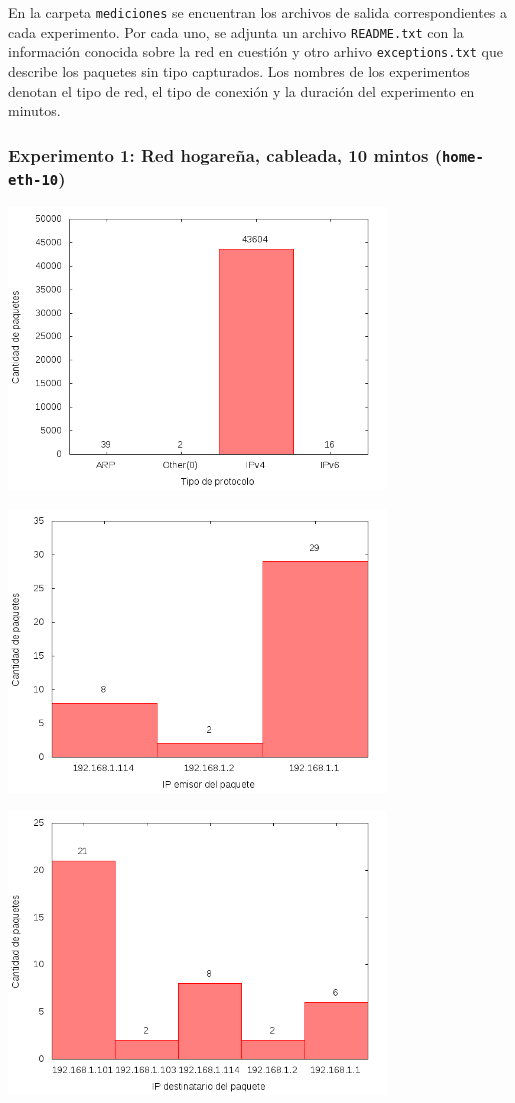 En la carpeta \texttt{mediciones} se encuentran los archivos de salida correspondientes a cada
experimento. Por cada uno, se adjunta un archivo \texttt{README.txt} con la información conocida
sobre la red en cuestión y otro arhivo \texttt{exceptions.txt} que describe los paquetes sin tipo
capturados. Los nombres de los experimentos denotan el tipo de red, el tipo de conexión y la
duración del experimento en minutos.

\subsubsection{Experimento 1: Red hogareña, cableada, 10 mintos (\texttt{home-eth-10})}

\includegraphics[width=10cm]{../mediciones/home-eth-10/home-eth-10Protocolos.png}

\includegraphics[width=10cm]{../mediciones/home-eth-10/home-eth-10IpsSrcArp.png}

\includegraphics[width=10cm]{../mediciones/home-eth-10/home-eth-10IpsDstArp.png}

